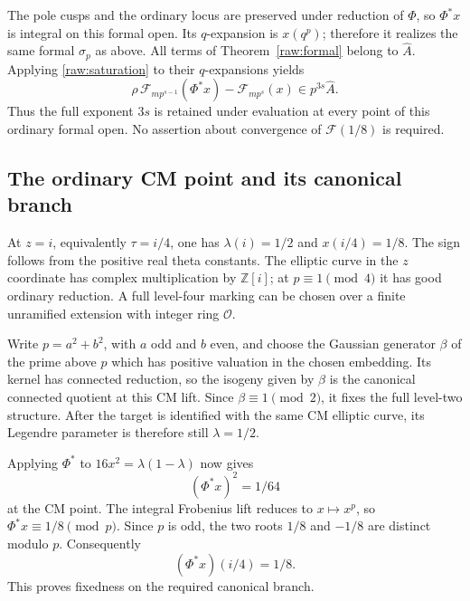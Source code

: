 \documentclass[11pt,a4paper]{article}
\begin{document}
The pole cusps and the ordinary locus are preserved under reduction of
$\Phi$, so $\Phi^*x$ is integral on this formal open.  Its $q$-expansion
is $x(q^p)$; therefore it realizes the same formal $\sigma_p$ as above.
All terms of Theorem~\ref{raw:formal} belong to $\widehat A$.  Applying
\eqref{raw:saturation} to their $q$-expansions yields
\begin{equation}\label{raw:analytic}
 \rho\,\mathcal F_{mp^{s-1}}(\Phi^*x)
       -\mathcal F_{mp^s}(x)\in p^{3s}\widehat A.
\end{equation}
Thus the full exponent $3s$ is retained under evaluation at every point
of this ordinary formal open.  No assertion about convergence of
$\mathcal F(1/8)$ is required.


\subsection{The ordinary CM point and its canonical branch}

At $z=i$, equivalently $\tau=i/4$, one has $\lambda(i)=1/2$ and
$x(i/4)=1/8$. The sign follows from the positive real theta constants.
The elliptic curve in the $z$ coordinate has complex multiplication by
$\mathbb Z[i]$; at $p\equiv1\pmod4$ it has good ordinary reduction.
A full level-four marking can be chosen over a finite unramified
extension with integer ring $\mathcal O$.

Write $p=a^2+b^2$, with $a$ odd and $b$ even, and choose the Gaussian
generator $\beta$ of the prime above $p$ which has positive valuation in
the chosen embedding. Its kernel has connected reduction, so the isogeny
given by $\beta$ is the canonical connected quotient at this CM lift.
Since $\beta\equiv1\pmod2$, it fixes the full level-two structure.
After the target is identified with the same CM elliptic curve, its
Legendre parameter is therefore still $\lambda=1/2$.

Applying $\Phi^*$ to $16x^2=\lambda(1-\lambda)$ now gives
\[
 (\Phi^*x)^2=1/64
\]
at the CM point. The integral Frobenius lift reduces to $x\mapsto x^p$,
so $\Phi^*x\equiv1/8\pmod p$. Since $p$ is odd, the two roots $1/8$
and $-1/8$ are distinct modulo $p$. Consequently
\begin{equation}\label{raw:fixed}
 (\Phi^*x)(i/4)=1/8.
\end{equation}
This proves fixedness on the required canonical branch.
\end{document}
